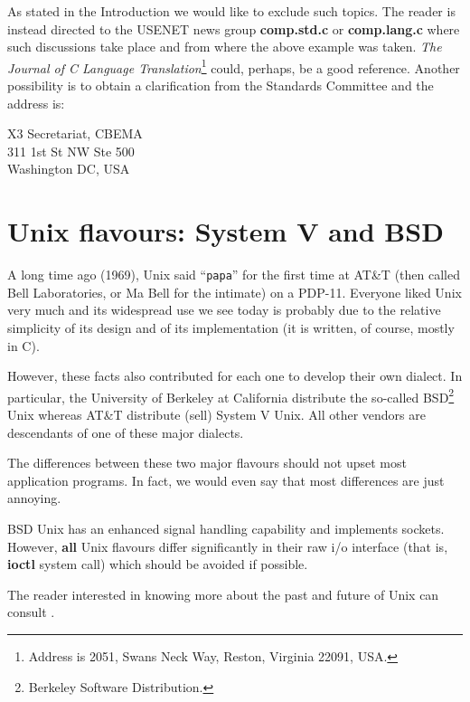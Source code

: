 As stated in the Introduction we would like to exclude such topics.
The reader is instead directed to the USENET news group {\bf comp.std.c}
or {\bf comp.lang.c}
where such discussions take place and from where the above example
was taken. {\em The Journal of C Language Translation}\footnote{Address
is 2051, Swans Neck Way, Reston, Virginia 22091, USA.} could, perhaps,
be a good reference. Another possibility is to obtain a clarification
from the Standards Committee and the address is:
{\small
\begin{center}
\begin{flushleft}
X3 Secretariat, CBEMA\\
311 1st St NW Ste 500\\
Washington DC, USA\\
\end{flushleft}
\end{center}
}
\section{Unix flavours: System V and BSD}

A long time ago (1969),
 Unix said ``{\tt papa}'' for the first time at AT\&T
(then called Bell Laboratories, or Ma Bell for the
intimate) on a PDP-11. Everyone liked Unix very much and its widespread
use we see today is probably due to the relative simplicity 
of its design and of its implementation (it is written, of course, mostly
in C).

However, these facts also contributed for each one to develop their own
dialect. In particular, the University of Berkeley at California distribute
the so-called BSD\footnote{Berkeley Software Distribution.} Unix whereas
AT\&T distribute (sell) System V Unix. All other vendors are descendants of
one of these major dialects.

The differences between these two major flavours should not upset most
application programs. In fact, we would even say that most differences are
just annoying.

BSD Unix has an enhanced signal handling capability and implements sockets.
However, {\bf all} Unix flavours differ significantly in their raw i/o
interface (that is, {\bf ioctl} system call) which should
be avoided if possible.

The reader interested in knowing more about the past and future of
Unix can consult \cite{kn:unix1,kn:unix2}.

